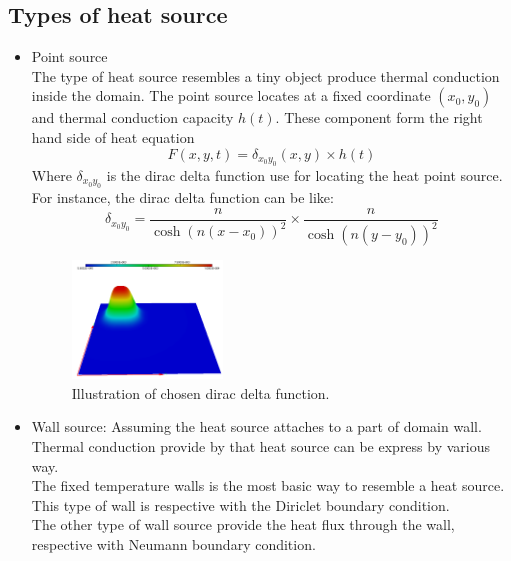 \subsection{Types of heat source}
\begin{itemize}
	\item Point source\\
	The type of heat source resembles a tiny object produce thermal conduction inside the domain. The point source locates at a fixed coordinate $(x_0,y_0)$ and thermal conduction capacity $h(t)$. These component form the right hand side of heat equation
	$$
	F(x,y,t) = \delta_{x_0 y_0}(x,y)\times h(t)
	$$
	Where $\delta_{x_0 y_0}$ is the dirac delta function use for locating the heat point source. For instance, the dirac delta function can be like:
	$$
	\delta_{x_0 y_0} = \dfrac{n}{\cosh(n(x-x_0))^2}\times\dfrac{n}{\cosh(n(y-y_0))^2}
	$$
	\begin{figure}[ht]
		\centering
		\includegraphics[width=4cm]{figures/dirac}
		\caption{Illustration of chosen dirac delta function.}
	\end{figure}
	\item Wall source: Assuming the heat source attaches to a part of domain wall. Thermal conduction provide by that heat source can be express by various way.\\
	The fixed temperature walls is the most basic way to resemble a heat source. This type of wall is respective with the Diriclet boundary condition.\\
	The other type of wall source provide the heat flux through the wall, respective with Neumann boundary condition.\\
\end{itemize}